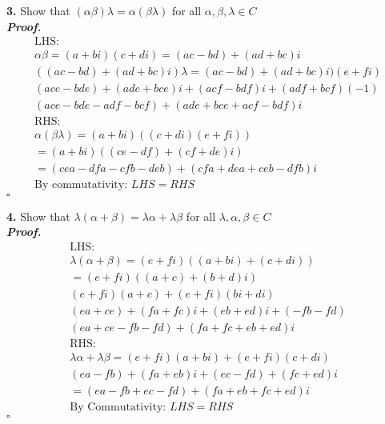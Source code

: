\documentclass[12pt]{article} %
\newenvironment{solution}[1][\it{Proof}]{\textbf{#1. } }{$\square$}
\begin{document}
\textbf{3.} Show that $(\alpha\beta)\lambda = \alpha(\beta\lambda)$ for all $\alpha,\beta,\lambda \in C$ \\

\begin{solution}
\begin{align*}
    &\text{LHS: } & \\ 
    &\alpha\beta = (a+bi)(c+di) = (ac - bd) + (ad + bc)i & \\
    &((ac - bd) + (ad + bc)i)\lambda = (ac - bd) + (ad + bc)i)(e+fi) & \\
    &(ace - bde) + (ade+bce)i +(acf - bdf)i + (adf+bcf)(-1) & \\
    &(ace-bde-adf-bcf)+(ade+bce+acf-bdf)i & \\
    &\text{RHS: } & \\ 
    & \alpha(\beta\lambda) = (a+bi)((c+di)(e+fi)) & \\
    & = (a+bi)((ce-df)+(cf+de)i)  & \\
    & = (cea - dfa -cfb -deb) + (cfa+dea +ceb -dfb)i & \\
    & \text{By commutativity: } LHS = RHS &
\end{align*}
\end{solution}

\textbf{4.} Show that $\lambda(\alpha + \beta) = \lambda\alpha + \lambda\beta$ for all $\lambda, \alpha, \beta \in C$ \\

\begin{solution}
\begin{align*} 
    &\text{LHS: } &\\
    &\lambda(\alpha+\beta) = (e+fi)((a+bi) + (c+di)) &\\
    &= (e+fi)((a+c)+(b+d)i) &\\
    &(e+fi)(a+c)+(e+fi)(bi+di) & \\
    &(ea +ce) + (fa +fc)i + (eb + ed)i +(-fb -fd)& \\
    &(ea + ce - fb - fd) + (fa+fc+eb+ed)i &\\
    &\text{RHS: } &\\
    &\lambda\alpha + \lambda\beta = (e+fi)(a+bi) + (e+fi)(c+di) &\\
    &(ea-fb) + (fa+eb)i + (ec-fd)+(fc+ed)i& \\
    &= (ea-fb+ec-fd) + (fa+eb+fc+ed)i &  \\
    &\text{By Commutativity: } LHS = RHS &
\end{align*}
\end{solution}
\end{document}

